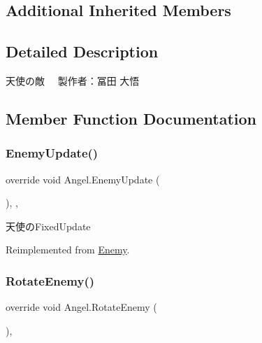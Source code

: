 \subsection*{Additional Inherited Members}


\subsection{Detailed Description}
天使の敵　 製作者：冨田 大悟 



\subsection{Member Function Documentation}
\mbox{\label{class_angel_a2c35f5d2b12e43d64cc686728a6225c2}} 
\subsubsection{\texorpdfstring{Enemy\+Update()}{EnemyUpdate()}}
{\footnotesize\ttfamily override void Angel.\+Enemy\+Update (\begin{DoxyParamCaption}{ }\end{DoxyParamCaption})\hspace{0.3cm}{\ttfamily [inline]}, {\ttfamily [protected]}, {\ttfamily [virtual]}}



天使の\+Fixed\+Update 



Reimplemented from \hyperlink{class_enemy_ab19a73003a5b443ba93f4b6a45c0abad}{Enemy}.

\mbox{\label{class_angel_ade12610b82079f5748f8d1393cce1f9b}} 
\subsubsection{\texorpdfstring{Rotate\+Enemy()}{RotateEnemy()}}
{\footnotesize\ttfamily override void Angel.\+Rotate\+Enemy (\begin{DoxyParamCaption}{ }\end{DoxyParamCaption})\hspace{0.3cm}{\ttfamily [inline]}, {\ttfamily [virtual]}}



